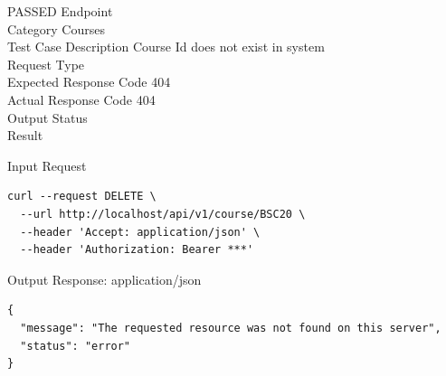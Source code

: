 \begin{testcase}{73}{PASSED}
Endpoint \hfill {}\\
Category \hfill Courses\\
Test Case Description \hfill Course Id does not exist in system\\

Request Type    \hfill {}\\
Expected Response Code    \hfill 404\\
Actual Response Code    \hfill 404\\

Output Status \hfill {}\\
Result \hfill {}

\begin{ipblock}{Input Request}
\begin{verbatim}
curl --request DELETE \
  --url http://localhost/api/v1/course/BSC20 \
  --header 'Accept: application/json' \
  --header 'Authorization: Bearer ***'
\end{verbatim}
\end{ipblock}

\begin{opblock}{Output Response: application/json}
\begin{verbatim}
{
  "message": "The requested resource was not found on this server",
  "status": "error"
}
\end{verbatim}
\end{opblock}
\end{testcase}

